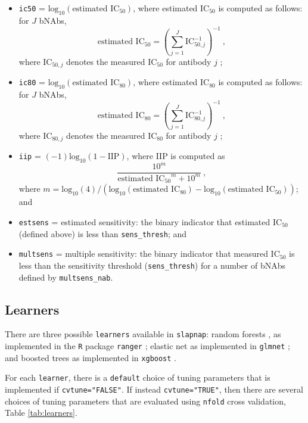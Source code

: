 \documentclass[]{article}
\providecommand{\tightlist}{%
  \setlength{\itemsep}{0pt}\setlength{\parskip}{0pt}}
\begin{document}
\begin{itemize}
\tightlist
\item
  \texttt{ic50} = \(\mbox{log}_{10}(\mbox{estimated IC}_{50})\), where
  estimated IC\(_{50}\) is computed as follows: for \(J\) bNAbs,
  \[ \mbox{estimated IC}_{50} = \left( \sum_{j=1}^J \mbox{IC}_{50,j}^{-1} \right)^{-1} \ , \]
  where IC\(_{50,j}\) denotes the measured IC\(_{50}\) for antibody
  \(j\) \citep{wagh2016optimal};
\item
  \texttt{ic80} = \(\mbox{log}_{10}(\mbox{estimated IC}_{80})\), where
  estimated IC\(_{80}\) is computed as follows: for \(J\) bNAbs,
  \[ \mbox{estimated IC}_{80} = \left( \sum_{j=1}^J \mbox{IC}_{80,j}^{-1} \right)^{-1} \ , \]
  where IC\(_{80,j}\) denotes the measured IC\(_{80}\) for antibody
  \(j\) \citep{wagh2016optimal};
\item
  \texttt{iip} = \((-1)\mbox{log}_{10}(1 - \mbox{IIP})\), where IIP is
  computed as \[ \frac{10^m}{\mbox{estimated IC$_{50}$}^m + 10^m} \ , \]
  where
  \(m = \mbox{log}_{10}(4) / (\mbox{log}_{10}(\mbox{estimated IC}_{80}) - \mbox{log}_{10}(\mbox{estimated IC}_{50}))\);
  and
\item
  \texttt{estsens} = estimated sensitivity: the binary indicator that
  estimated IC\(_{50}\) (defined above) is less than
  \texttt{sens\_thresh}; and
\item
  \texttt{multsens} = multiple sensitivity: the binary indicator that
  measured IC\(_{50}\) is less than the sensitivity threshold
  (\texttt{sens\_thresh}) for a number of bNAbs defined by
  \texttt{multsens\_nab}.
\end{itemize}

\subsection{Learners}\label{sec:learnerdetails}

There are three possible \texttt{learners} available in
\texttt{slapnap}: random forests \citep{breiman2001}, as implemented in
the \texttt{R} package \texttt{ranger} \citep{rangerpkg}; elastic net
\citep{zou2005} as implemented in \texttt{glmnet} \citep{glmnetpkg}; and
boosted trees \citep{friedman2001, chen2016} as implemented in
\texttt{xgboost} \citep{xgboostpkg}.

For each \texttt{learner}, there is a \texttt{default} choice of tuning
parameters that is implemented if \texttt{cvtune="FALSE"}. If instead
\texttt{cvtune="TRUE"}, then there are several choices of tuning
parameters that are evaluated using \texttt{nfold} cross validation,
Table \ref{tab:learners}.
\end{document}

